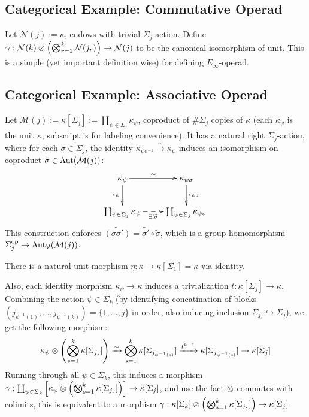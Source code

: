 \documentclass{article}
\begin{document}
\hfil

\subsection{Categorical Example: Commutative Operad}

Let $\mathcal{N}(j):=\kappa$, endows with trivial $\Sigma_j$-action. Define $\gamma:\mathcal{N}(k)\otimes \left(\bigotimes_{r=1}^k \mathcal{N}(j_r)\right)\rightarrow \mathcal{N}(j)$ to be the canonical isomorphism of unit. This is a simple (yet important definition wise) for defining $E_\infty$-operad.

\hfil

\subsection{Categorical Example: Associative Operad}

Let $\mathcal{M}(j):=\kappa[\Sigma_j]:= \coprod_{\psi\in\Sigma_j}\kappa_\psi$, coproduct of $\#\Sigma_j$ copies of $\kappa$ (each $\kappa_\psi$ is the unit $\kappa$, subscript is for labeling convenience). It has a natural right $\Sigma_j$-action, where for each $\sigma\in\Sigma_j$, the identity $\kappa_{\psi\sigma^{-1}}\xrightarrow{\sim} \kappa_{\psi}$ induces an isomorphism on coproduct $\tilde{\sigma}\in \mathrm{Aut}(\mathcal{M}(j))$:
\[\xymatrix{
    \kappa_{\psi} \ar[d]_-{\iota_{\psi}} \ar[r]^-{\sim} & \kappa_{\psi\sigma} \ar[d]^-{\iota_{\psi\sigma}}\\
    \coprod_{\psi\in\Sigma_j}\kappa_{\psi} \ar@{-->}[r]_-{\exists ! \tilde{\sigma}} & \coprod_{\psi\in\Sigma_j}\kappa_{\psi\sigma} 
}\]
This construction enforces $\tilde{(\sigma\sigma')} = \tilde{\sigma'}\circ \tilde{\sigma}$, which is a group homomorphism $\Sigma_j^{\mathrm{op}}\rightarrow\mathrm{Aut}_\mathcal{V}(\mathcal{M}(j))$.

There is a natural unit morphism $\eta:\kappa\rightarrow \kappa[\Sigma_1] = \kappa$ via identity.

Also, each identity morphism $\kappa_\psi\rightarrow \kappa$ induces a trivialization $t:\kappa[\Sigma_j]\rightarrow\kappa$. Combining the action $\psi\in \Sigma_k$ (by identifying concatination of blocks $(j_{\psi^{-1}(1)},...,j_{\psi^{-1}(k)})=\{1,...,j\}$ in order, also inducing inclusion $\Sigma_{j_s}\hookrightarrow \Sigma_j$), we get the following morphism:
\[\kappa_\psi \otimes \left(\bigotimes_{s=1}^k \kappa[\Sigma_{j_s}]\right)\xrightarrow{\sim} \bigotimes_{s=1}^k \kappa[\Sigma_{j_{\psi^{-1}(s)}}] \xrightarrow{t^{k-1}} \kappa[\Sigma_{j_{\psi^{-1}(s)}}] \rightarrow \kappa[\Sigma_j]\]
Running through all $\psi\in\Sigma_k$, this induces a morphism $\gamma:\coprod_{\psi\in\Sigma_k}\left[\kappa_\psi \otimes \left(\bigotimes_{s=1}^k \kappa[\Sigma_{j_s}]\right)\right] \rightarrow \kappa[\Sigma_j]$, and use the fact $\otimes$ commutes with colimits, this is equivalent to a morphism $\gamma:\kappa[\Sigma_k]\otimes \left(\bigotimes_{s=1}^k \kappa[\Sigma_{j_s}]\right)\rightarrow \kappa[\Sigma_j]$.
\end{document}
